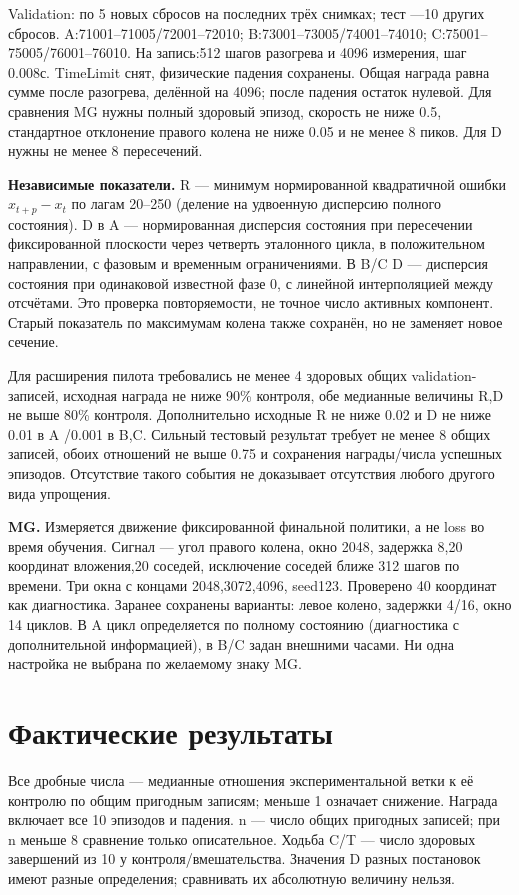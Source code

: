 \documentclass[10pt,a4paper]{article}
\begin{document}
Validation: по 5 новых сбросов на последних трёх снимках; тест ---10 других сбросов. A:71001--71005/72001--72010; B:73001--73005/74001--74010; C:75001--75005/76001--76010. На запись:512 шагов разогрева и 4096 измерения, шаг 0.008с. TimeLimit снят, физические падения сохранены. Общая награда равна сумме после разогрева, делённой на 4096; после падения остаток нулевой. Для сравнения MG нужны полный здоровый эпизод, скорость не ниже 0.5, стандартное отклонение правого колена не ниже 0.05 и не менее 8 пиков. Для D нужны не менее 8 пересечений.

\textbf{Независимые показатели.} R --- минимум нормированной квадратичной ошибки $x_{t+p}-x_t$ по лагам 20--250 (деление на удвоенную дисперсию полного состояния). D в A --- нормированная дисперсия состояния при пересечении фиксированной плоскости через четверть эталонного цикла, в положительном направлении, с фазовым и временным ограничениями. В B/C D --- дисперсия состояния при одинаковой известной фазе 0, с линейной интерполяцией между отсчётами. Это проверка повторяемости, не точное число активных компонент. Старый показатель по максимумам колена также сохранён, но не заменяет новое сечение.

Для расширения пилота требовались не менее 4 здоровых общих validation-записей, исходная награда не ниже 90\% контроля, обе медианные величины R,D не выше 80\% контроля. Дополнительно исходные R не ниже 0.02 и D не ниже 0.01 в A /0.001 в B,C. Сильный тестовый результат требует не менее 8 общих записей, обоих отношений не выше 0.75 и сохранения награды/числа успешных эпизодов. Отсутствие такого события не доказывает отсутствия любого другого вида упрощения.

\textbf{MG.} Измеряется движение фиксированной финальной политики, а не loss во время обучения. Сигнал --- угол правого колена, окно 2048, задержка 8,20 координат вложения,20 соседей, исключение соседей ближе 312 шагов по времени. Три окна с концами 2048,3072,4096, seed123. Проверено 40 координат как диагностика. Заранее сохранены варианты: левое колено, задержки 4/16, окно 14 циклов. В A цикл определяется по полному состоянию (диагностика с дополнительной информацией), в B/C задан внешними часами. Ни одна настройка не выбрана по желаемому знаку MG.

\newpage
\section*{Фактические результаты}

Все дробные числа --- медианные отношения экспериментальной ветки к её контролю по общим пригодным записям; меньше 1 означает снижение. Награда включает все 10 эпизодов и падения. n --- число общих пригодных записей; при n меньше 8 сравнение только описательное. Ходьба C/T --- число здоровых завершений из 10 у контроля/вмешательства. Значения D разных постановок имеют разные определения; сравнивать их абсолютную величину нельзя.
\end{document}
